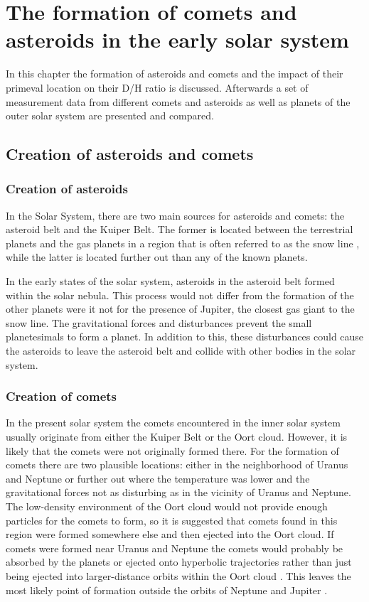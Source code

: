 \section{\label{chap:formation}The formation of comets and asteroids in the early solar system}
In this chapter the formation of asteroids and comets and the impact of their primeval location on their D/H ratio is discussed. Afterwards a set of measurement data from different comets and asteroids as well as planets of the outer solar system are presented and compared.
\subsection{Creation of asteroids and comets}
\subsubsection{Creation of asteroids}
In the Solar System, there are two main sources for asteroids and comets: the asteroid belt and the Kuiper Belt. The former is located between the terrestrial planets and the gas planets in a region that is often referred to as the snow line \cite{asteroid_belts}, while the latter is located further out than any of the known planets.

In the early states of the solar system, asteroids in the asteroid belt formed within the solar nebula. This process would not differ from the formation of the other planets were it not for the presence of Jupiter, the closest gas giant to the snow line. The gravitational forces and disturbances prevent the small planetesimals to form a planet. In addition to this, these disturbances could cause the asteroids to leave the asteroid belt and collide with other bodies in the solar system. \cite{asteroid_belts}

\subsubsection{Creation of comets}
In the present solar system the comets encountered in the inner solar system usually originate from either the Kuiper Belt or the Oort cloud. However, it is likely that the comets were not originally formed there.
For the formation of comets there are two plausible locations: either in the neighborhood of Uranus and Neptune or further out where the temperature was lower and the gravitational forces not as disturbing as in the vicinity of Uranus and Neptune. The low-density environment of the Oort cloud would not provide enough particles for the comets to form, so it is suggested that comets found in this region were formed somewhere else and then ejected into the Oort cloud.
If comets were formed near Uranus and Neptune the comets would probably be absorbed by the planets or ejected onto hyperbolic trajectories rather than just being ejected into larger-distance orbits within the Oort cloud \cite{comets_radiation_pressure}. This leaves the most likely point of formation outside the orbits of Neptune and Jupiter \cite{comets_origin}.



